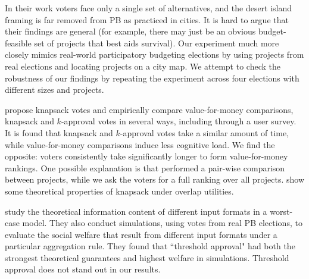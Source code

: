 \documentclass{comsoc2023}
\begin{document}
In their work voters face only a single set of alternatives, and the desert island framing is far removed from PB as practiced in cities.  It is  hard  to argue that their findings are general  (for example, there may just be an obvious budget-feasible set of projects that best aids survival).   Our experiment much more closely mimics real-world participatory budgeting elections by using projects from real elections and  locating projects on a city map. We   attempt to check the robustness of our findings by repeating the experiment across four elections with different sizes and projects. %

\citet{goel2019knapsack} propose knapsack votes and empirically compare       value-for-money comparisons, knapsack and $k$-approval votes in several ways, including through a user survey. It is found that knapsack and $k$-approval votes take a similar amount of time, while value-for-money comparisons induce less cognitive load.  We find the opposite: voters consistently take significantly longer to  form value-for-money rankings. One possible explanation is that \citet{goel2019knapsack} performed a pair-wise comparison between projects, while we ask the voters for a full ranking over all projects. \citet{goel2019knapsack}   show some theoretical properties of knapsack under overlap utilities. 

\citet{benade2021preference}  study the theoretical information content of different input formats in a worst-case model.
They also conduct simulations, using votes from real PB elections,  to evaluate the social welfare that result from different input formats under a particular aggregation rule. They found that ``threshold approval" had both the strongest theoretical guarantees and highest welfare in simulations. %
Threshold approval does not stand out in our results.
% 
\end{document}
